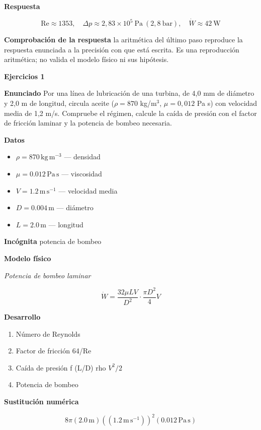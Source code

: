 \documentclass[10pt,openany]{book}
\begin{document}
\noindent\textbf{Respuesta}

\[
\mathrm{Re} \approx 1353,\quad \Delta p \approx 2{,}83\times 10^{5}\ \mathrm{Pa}\ (2{,}8\ \mathrm{bar}),\quad \dot W \approx 42\ \mathrm{W}
\]

\noindent\textbf{Comprobación de la respuesta} la aritmética del último paso reproduce la respuesta enunciada a la precisión con que está escrita. Es una reproducción aritmética; no valida el modelo físico ni sus hipótesis.

\noindent\textbf{Ejercicios 1}

\noindent\textbf{Enunciado}
Por una línea de lubricación de una turbina, de 4,0 mm de diámetro y 2,0 m de longitud, circula aceite (\(\rho = 870\) kg/m\(^3\), \(\mu = 0{,}012\) Pa s) con velocidad media de 1,2 m/s. Compruebe el régimen, calcule la caída de presión con el factor de fricción laminar y la potencia de bombeo necesaria.

\noindent\textbf{Datos}
\begin{itemize}
\item $\rho = 870\,\mathrm{kg}\,\mathrm{m}^{-3}$ — densidad
\item $\mu = 0.012\,\mathrm{Pa}\,\mathrm{s}$ — viscosidad
\item $V = 1.2\,\mathrm{m}\,\mathrm{s}^{-1}$ — velocidad media
\item $D = 0.004\,\mathrm{m}$ — diámetro
\item $L = 2.0\,\mathrm{m}$ — longitud
\end{itemize}

\noindent\textbf{Incógnita}
potencia de bombeo

\noindent\textbf{Modelo físico}

\noindent\textit{Potencia de bombeo laminar}

\[
\dot W = \frac{32\mu L V}{D^{2}}\cdot\frac{\pi D^{2}}{4}V
\]

\noindent\textbf{Desarrollo}
\begin{enumerate}
\item
Número de Reynolds
\item
Factor de fricción 64/Re
\item
Caída de presión f (L/D) rho \(V^2/2\)
\item
Potencia de bombeo
\end{enumerate}

\noindent\textbf{Sustitución numérica}

\[
8 \pi \left(2.0\,\mathrm{m}\right) \left(\left(1.2\,\mathrm{m}\,\mathrm{s}^{-1}\right)\right)^{2} \left(0.012\,\mathrm{Pa}\,\mathrm{s}\right)
\]
\end{document}
